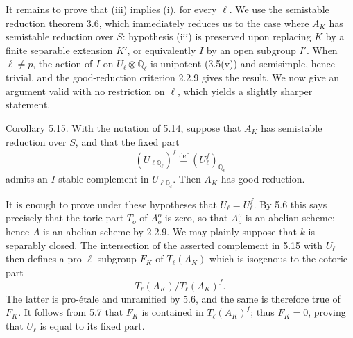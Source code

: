 It remains to prove that (iii) implies (i), for every $\ell$. We use
the semistable reduction theorem 3.6, which immediately reduces us to
the case where $A_K$ has semistable reduction over $S$: hypothesis
(iii) is preserved upon replacing $K$ by a finite separable extension
$K'$, or equivalently $I$ by an open subgroup $I'$. When $\ell\neq p$,
the action of $I$ on $U_\ell\otimes\mathbb Q_\ell$ is unipotent
(3.5(v)) and semisimple, hence trivial, and the good-reduction
criterion 2.2.9 gives the result. We now give an argument valid with no
restriction on $\ell$, which yields a slightly sharper statement.

\medskip
\noindent
\underline{Corollary} 5.15. With the notation of 5.14, suppose that
$A_K$ has semistable reduction over $S$, and that the fixed part
\[
 (U_{\ell\mathbb Q_\ell})^f
 \stackrel{\mathrm{def}}{=}(U_\ell^f)_{\mathbb Q_\ell}
\]
admits an $I$-stable complement in $U_{\ell\mathbb Q_\ell}$. Then
$A_K$ has good reduction.

It is enough to prove under these hypotheses that $U_\ell=U_\ell^f$.
By 5.6 this says precisely that the toric part $T_o$ of $A_o^o$ is
zero, so that $A_o^o$ is an abelian scheme; hence $A$ is an abelian
scheme by 2.2.9. We may plainly suppose that $k$ is separably closed.
The intersection of the asserted complement in 5.15 with $U_\ell$
then defines a pro-$\ell$ subgroup $F_K$ of $T_\ell(A_K)$ which is
isogenous to the cotoric part
\[
 T_\ell(A_K)/T_\ell(A_K)^f.
\]
The latter is pro-\'{e}tale and unramified by 5.6, and the same is
therefore true of $F_K$. It follows from 5.7 that $F_K$ is contained
in $T_\ell(A_K)^f$; thus $F_K=0$, proving that $U_\ell$ is equal to
its fixed part.
